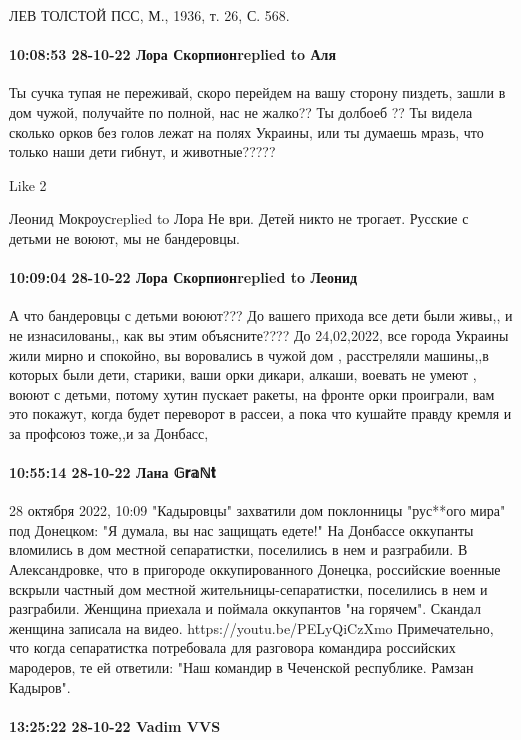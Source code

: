 ЛЕВ ТОЛСТОЙ
ПСС, М., 1936, т. 26, С. 568.


\paragraph{10:08:53 28-10-22 Лора Скорпионreplied to Аля}

Ты сучка тупая не переживай, скоро перейдем на вашу сторону пиздеть, зашли в
дом чужой, получайте по полной, нас не жалко?? Ты долбоеб ?? Ты видела сколько
орков без голов лежат на полях Украины, или ты думаешь мразь, что только наши
дети гибнут, и животные?????

    Like 2

Леонид Мокроусreplied to Лора
Не ври. Детей никто не трогает. Русские с детьми не воюют, мы не бандеровцы.

\paragraph{10:09:04 28-10-22 Лора Скорпионreplied to Леонид}

А что бандеровцы с детьми воюют??? До вашего прихода все дети были живы,, и не
изнасилованы,, как вы этим объясните???? До 24,02,2022, все города Украины жили
мирно и спокойно, вы воровались в чужой дом , расстреляли машины,,в которых
были дети, старики, ваши орки дикари, алкаши, воевать не умеют , воюют с
детьми, потому хутин пускает ракеты, на фронте орки проиграли, вам это покажут,
когда будет переворот в рассеи, а пока что кушайте правду кремля и за профсоюз
тоже,,и за Донбасс,

\paragraph{10:55:14 28-10-22 Лана 𝔾𝐫𝕒ℕ𝐭}

28 октября 2022, 10:09 "Кадыровцы" захватили дом поклонницы "рус**ого мира" под Донецком: "Я думала, вы нас защищать едете!" На Донбассе оккупанты вломились в дом местной сепаратистки, поселились в нем и разграбили.
В Александровке, что в пригороде оккупированного Донецка, российские военные вскрыли частный дом местной жительницы-сепаратистки, поселились в нем и разграбили. Женщина приехала и поймала оккупантов "на горячем". Скандал женщина записала на видео.
https://youtu.be/PELyQiCzXmo
Примечательно, что когда сепаратистка потребовала для разговора командира российских мародеров, те ей ответили: "Наш командир в Чеченской республике. Рамзан Кадыров".

\paragraph{13:25:22 28-10-22 Vadim VVS}

